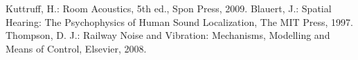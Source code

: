 \documentclass[10pt]{jsarticle}
\begin{document}
\begin{thebibliography}{9}
     Kuttruff, H.: Room Acoustics, 5th ed., Spon Press, 2009.
     Blauert, J.: Spatial Hearing: The Psychophysics of Human Sound Localization, The MIT Press, 1997.
     Thompson, D. J.: Railway Noise and Vibration: Mechanisms, Modelling and Means of Control, Elsevier, 2008.
\end{thebibliography}
\end{document}
